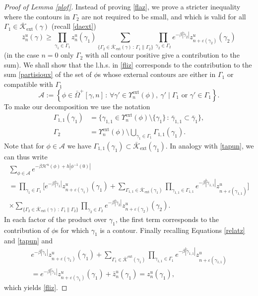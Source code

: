 \documentclass[10pt]{amsart}
\let\mathcal\mathscr
\newcommand{\sep}{\,:\,}
\numberwithin{equation}{section}
\theoremstyle{plain}
\theoremstyle{definition}
\newcommand{\ext}{\mathrm{ext}}
\newcommand{\cA}{{\ensuremath{\mathcal A}} }
\newcommand{\cH}{{\ensuremath{\mathcal H}} }
\newcommand{\cK}{{\ensuremath{\mathcal K}} }
\newcommand{\gb}{\beta}
\newcommand{\gep}{\varepsilon}
\newcommand{\gG}{\Gamma}
\newcommand{\gO}{\Omega}
\begin{document}
\begin{proof}[Proof of Lemma \ref{plof}]

Instead of proving \eqref{flaz}, we prove a stricter inequality where the contours in $\gG_2$ are not required to be small, and which is valid
for all $\gG_1\in \bar \cK_{\ext}(\gamma)$ (recall \eqref{daext})
\begin{equation}\label{fliz}
\bar z^{u}_{n}(\gamma)\ge \prod_{\gamma_1\in \gG_1} z^u_{n}(\gamma_1) \sum_{\{ \gG_2 \in \bar \cK_{\ext}(\gamma) \sep \gG_1 \parallel \gG_2\}}
\prod_{\gamma_2\in \gG_2 } e^{-\gb |\tilde\gamma_2|} z^u_{n+\gep(\gamma_2)}(\gamma_2)
\end{equation}
(in the case $n=0$ only $\gG_2$ with all contour positive give a contribution to the sum).
We shall show that the l.h.s. in \eqref{fliz} corresponds to the contribution to the sum \eqref{partisioux} of
the set of $\phi$s whose external contours are either in $\gG_1$ or compatible with $\gG_1$
\[
\cA:=\left\{ \phi\in \bar \gO^+[\gamma,n] \sep \forall \gamma' \in \Upsilon^{\ext}_n(\phi),\ \gamma' \mid \gG_1 \text{ or } \gamma'\in \gG_1\right\}.
\]
To make our decomposition we use the notation
\begin{equation*}\begin{split}
\gG_{1,1}(\gamma_1)&=\{ \gamma_{1,1}\in \Upsilon^{\ext}_n(\phi)\setminus \{\gamma_1\} \sep \bar \gamma_{1,1}\subset \bar \gamma_1\},\\
\gG_2&=\Upsilon^{\ext}_n(\phi) \setminus \bigcup_{\gamma_1\in \gG_1}\gG_{1,1}(\gamma_1).
\end{split}\end{equation*}
Note that for $\phi\in \cA$ we have $\gG_{1,1}(\gamma_1)\subset \bar \cK_{\ext}(\gamma_1)$.
In analogy with \eqref{tapun}, we can thus write
\begin{multline*}
\sum_{\phi\in \cA} e^{-\gb \cH^n(\phi)+h|\phi^{-1}(0)|}\\[-8pt]
=
\prod_{\gamma_1\in \gG_1}\biggl[ e^{-\gb|\tilde \gamma_{1}|} z^u_{n+\gep(\gamma_1)}(\gamma_1)+ \sum_{\gG_{1,1}\in \bar \cK_{\ext}(\gamma_1)}
\prod_{\gamma_{1,1}\in \gG_{1,1}} e^{-\gb|\tilde \gamma_{1,1}|}z^u_{n+\gep(\gamma_{1,1})} \biggr]\\
\times\sum_{\{ \gG_2 \in \bar\cK_{\ext}(\gamma) \sep \gG_1 \parallel \gG_2\}} \prod_{\gamma_2\in \gG_2 } e^{-\gb |\tilde\gamma_2|} z^u_{n+\gep(\gamma_2)}(\gamma_2).
\end{multline*}
In each factor of the product over $\gamma_1$, the first term corresponds to the contribution of $\phi$s
for which $\gamma_1$ is a contour.
Finally recalling Equations \eqref{relatz} and \eqref{tapun} and
\begin{multline*}
e^{-\gb|\tilde \gamma_{1}|} z^u_{n+\gep(\gamma_1)}(\gamma_1)+ \sum_{\gG_1\in\bar\cK^{\ext}(\gamma_1)} \prod_{\gamma_{1,1}\in \gG_1} e^{-\gb|\tilde \gamma_{1,1}|}
z^u_{n+\gep(\gamma_{1,1})}\\[-5pt]
=
e^{-\gb|\tilde \gamma_{1}|} z^u_{n+\gep(\gamma_1)}(\gamma_1)+ \bar z^u_n(\gamma_1)= z^{u}_n(\gamma_1),
\end{multline*}
which yields \eqref{fliz}.
\end{proof}
\end{document}
